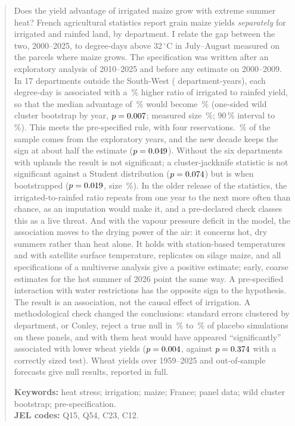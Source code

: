\begin{abstract}
\noindent Does the yield advantage of irrigated maize grow with extreme summer heat? French agricultural statistics report grain maize yields \emph{separately} for irrigated and rainfed land, by department. I relate the gap between the two, 2000--2025, to degree-days above 32\,$^{\circ}$C in July--August measured on the parcels where maize grows. The specification was written after an exploratory analysis of 2010--2025 and before any estimate on 2000--2009. In 17 departments outside the South-West (\QoneN{} department-years), each degree-day is associated with a \QonePct\,\% higher ratio of irrigated to rainfed yield, so that the median advantage of \GapMedianPct\,\% would become \GapMedianAfterPct\,\% (one-sided wild cluster bootstrap by year, $p = \QoneP$; measured size \QoneSizeWCR\,\%; 90\,\% interval \CiNinetyLow{} to \CiNinetyHigh\,\%). This meets the pre-specified rule, with four reservations. \ExploSharePct\,\% of the sample comes from the exploratory years, and the new decade keeps the sign at about half the estimate ($p = \QoneReplP$). Without the six departments with uplands the result is not significant; a cluster-jackknife statistic is not significant against a Student distribution ($p = \CvThreeP$) but is when bootstrapped ($p = \CvBootP$, size \CvBootSize\,\%). In the older release of the statistics, the irrigated-to-rainfed ratio repeats from one year to the next more often than chance, as an imputation would make it, and a pre-declared check classes this as a live threat. And with the vapour pressure deficit in the model, the association moves to the drying power of the air: it concerns hot, dry summers rather than heat alone. It holds with station-based temperatures and with satellite surface temperature, replicates on silage maize, and all \MultiN{} specifications of a multiverse analysis give a positive estimate; early, coarse estimates for the hot summer of 2026 point the same way. A pre-specified interaction with water restrictions has the opposite sign to the hypothesis. The result is an association, not the causal effect of irrigation. A methodological check changed the conclusions: standard errors clustered by department, or Conley, reject a true null in \UsualSizeMin\,\% to \UsualSizeMax\,\% of placebo simulations on these panels, and with them heat would have appeared ``significantly'' associated with lower wheat yields ($p = \WheatPdep$, against $p = \WheatPwcr$ with a correctly sized test). Wheat yields over 1959--2025 and out-of-sample forecasts give null results, reported in full.

\medskip\noindent\textbf{Keywords:} heat stress; irrigation; maize; France; panel data; wild cluster bootstrap; pre-specification.\\
\textbf{JEL codes:} Q15, Q54, C23, C12.
\end{abstract}
